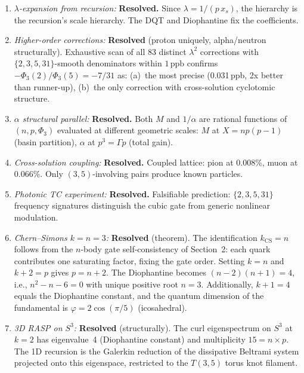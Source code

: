\documentclass[12pt,a4paper]{article}
\theoremstyle{definition}
\newcommand{\Phithree}{\Phi_3}
\newcommand{\ppb}{\,\mathrm{ppb}}
\begin{document}
\begin{enumerate}
  \item \emph{$\lambda$-expansion from recursion:} \textbf{Resolved.}
        Since $\lambda = 1/(p\,x_s)$, the hierarchy is the recursion's
        scale hierarchy. The DQT and Diophantine fix the coefficients.

  \item \emph{Higher-order corrections:} \textbf{Resolved} (proton uniquely,
        alpha/neutron structurally). Exhaustive scan of all 83 distinct
        $\lambda^2$ corrections with $\{2,3,5,31\}$-smooth denominators
        within $1\ppb$ confirms $-\Phithree(2)/\Phithree(5) = -7/31$ as:
        (a)~the most precise (0.031\,ppb, 2x better than runner-up),
        (b)~the only correction with cross-solution cyclotomic structure.

  \item \emph{$\alpha$ structural parallel:} \textbf{Resolved.}
        Both $M$ and $1/\alpha$ are rational functions of $(n, p, \Phithree)$
        evaluated at different geometric scales: $M$ at $X = np(p{-}1)$
        (basin partition), $\alpha$ at $p^3 = \Gamma p$ (total gain).

  \item \emph{Cross-solution coupling:} \textbf{Resolved.}
        Coupled lattice: pion at 0.008\%, muon at 0.066\%.
        Only $(3,5)$-involving pairs produce known particles.

  \item \emph{Photonic TC experiment:} \textbf{Resolved.}
        Falsifiable prediction: $\{2,3,5,31\}$ frequency signatures
        distinguish the cubic gate from generic nonlinear modulation.

  \item \emph{Chern--Simons $k = n = 3$:} \textbf{Resolved} (theorem).
        The identification $k_{\mathrm{CS}} = n$ follows from the $n$-body
        gate self-consistency of Section~2: each quark contributes one
        saturating factor, fixing the gate order.
        Setting $k = n$ and $k+2 = p$ gives $p = n+2$. The Diophantine
        becomes $(n{-}2)(n{+}1) = 4$, i.e., $n^2 - n - 6 = 0$ with unique
        positive root $n = 3$. Additionally, $k+1 = 4$ equals the Diophantine
        constant, and the quantum dimension of the fundamental is
        $\varphi = 2\cos(\pi/5)$ (icosahedral).

  \item \emph{3D RASP on $S^3$:} \textbf{Resolved} (structurally).
        The curl eigenspectrum on $S^3$ at $k=2$ has eigenvalue~4 (Diophantine
        constant) and multiplicity $15 = n \times p$. The 1D recursion is the
        Galerkin reduction of the dissipative Beltrami system projected onto
        this eigenspace, restricted to the $T(3,5)$ torus knot filament.
\end{enumerate}
\end{document}
